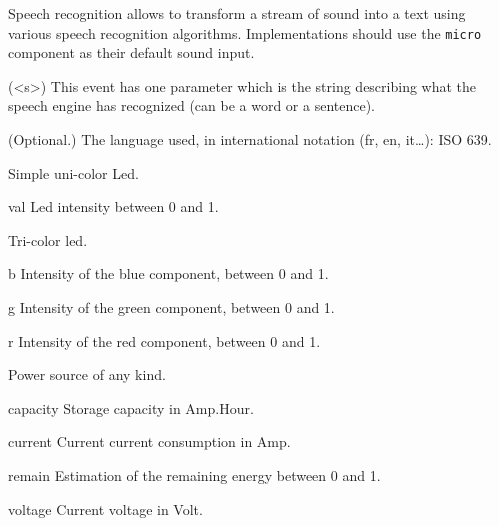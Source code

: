 
Speech recognition allows to transform a stream of sound into a text
using various speech recognition algorithms. Implementations
should use the \lstinline{micro} component as their default sound input.

\begin{urbiscriptapi}
\item[hear](<s>) This event has one parameter which is the string describing
  what the speech engine has recognized (can be a word or a sentence).


\item[lang]{} (Optional.)  The language used, in international notation (fr,
  en, it…): ISO 639.
\end{urbiscriptapi}


Simple uni-color Led.

\begin{urbiscriptapi}
\item[val] Led intensity between 0 and 1.
\end{urbiscriptapi}



Tri-color led.

\begin{urbiscriptapi}
\item[b] Intensity of the blue component, between 0 and 1.


\item[g] Intensity of the green component, between 0 and 1.


\item[r] Intensity of the red component, between 0 and 1.
\end{urbiscriptapi}


Power source of any kind.

\begin{urbiscriptapi}
\item[capacity] Storage capacity in Amp.Hour.


\item[current] Current current consumption in Amp.


\item[remain] Estimation of the remaining energy between 0 and 1.


\item[voltage] Current voltage in Volt.
\end{urbiscriptapi}


